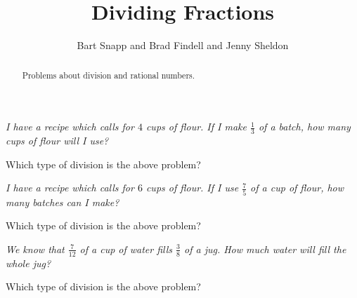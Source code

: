 \documentclass[nooutcomes]{ximera}
\title{Dividing Fractions}
\author{Bart Snapp and Brad Findell and Jenny Sheldon}
\begin{document}
\begin{abstract}
Problems about division and rational numbers.
\end{abstract}
\maketitle



\begin{problem}
{\em I have a recipe which calls for $4$ cups of flour.  If I make $\frac{1}{3}$ of a batch, how many cups of flour will I use?}

Which type of division is the above problem?
\begin{multipleChoice}
\end{multipleChoice}
\end{problem}



\begin{problem}
{\em I have a recipe which calls for $6$ cups of flour.  If I use $\frac{7}{5}$ of a cup of flour, how many batches can I make?}

Which type of division is the above problem?
\begin{multipleChoice}
\end{multipleChoice}
\end{problem}



\begin{problem}
{\em We know that $\frac{7}{12}$ of a cup of water fills $\frac{3}{8}$ of a jug.  How much water will fill the whole jug?}

Which type of division is the above problem?
\begin{multipleChoice}
\end{multipleChoice}
\end{problem}
\end{document}
